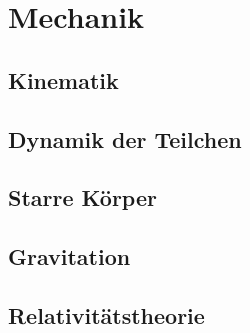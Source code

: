 \section{Mechanik}%
\label{mech:sec:mechanik}

\subsection{Kinematik}%
\label{mech:sub:kinematik}

\subsection{Dynamik der Teilchen}%
\label{mech:sub:dynamik_der_teilchen}

\subsection{Starre Körper}%
\label{mech:sub:starre_koerper}

\subsection{Gravitation}%
\label{mech:sub:gravitation}

\subsection{Relativitätstheorie}%
\label{mech:sub:relativitaetstheorie}

